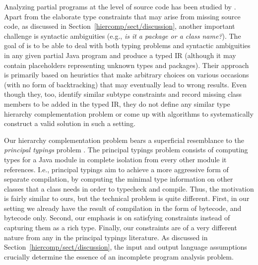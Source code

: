 Analyzing partial programs at the level of source code has been
studied by \citeauthor{oopsla/DagenaisH08}
\cite{oopsla/DagenaisH08}. Apart from the elaborate type constraints
that may arise from missing source code, as discussed in
Section~\ref{hiercomp/sect/discussion}, another important challenge is
syntactic ambiguities (e.g., \emph{is it a package or a class
  name?}). The goal of \citeauthor{oopsla/DagenaisH08} is to be able
to deal with both typing problems and syntactic ambiguities in any
given partial Java program and produce a typed IR (although it may
contain placeholders representing unknown types and packages). Their
approach is primarily based on heuristics that make arbitrary choices
on various occasions (with no form of backtracking) that may
eventually lead to wrong results. Even though they, too, identify
similar subtype constraints and record missing class members to be
added in the typed IR, they do not define any similar type hierarchy
complementation problem or come up with algorithms to systematically
construct a valid solution in such a setting.


Our hierarchy complementation problem bears a superficial resemblance
to the \emph{principal typings} problem
\cite{popl/AnconaZ04,popl/AnconaDDZ05,Ancona04even}.  The principal
typings problem consists of computing types for a Java module in
complete isolation from every other module it references. I.e.,
principal typings aim to achieve a more aggressive form of separate
compilation, by computing the minimal type information on other
classes that a class needs in order to typecheck and compile. Thus,
the motivation is fairly similar to ours, but the technical problem is
quite different.  First, in our setting we already have the result of
compilation in the form of bytecode, and bytecode only. Second, our
emphasis is on satisfying constraints instead of capturing them as a
rich type. Finally, our constraints are of a very different nature
from any in the principal typings literature. As discussed in
Section~\ref{hiercomp/sect/discussion}, the input and output language
assumptions crucially determine the essence of an incomplete program
analysis problem.



